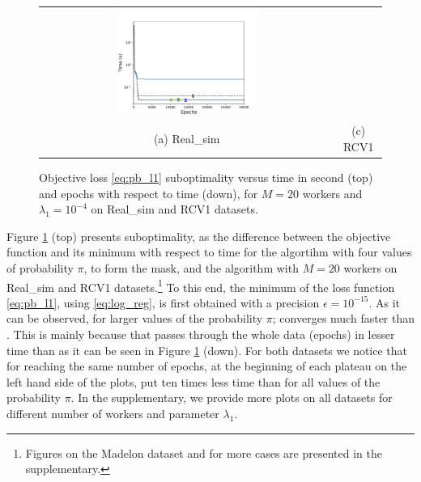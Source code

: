 \begin{figure}[b!]
\begin{tabular}{cc}
\includegraphics[width = 0.5\textwidth]{SODA/Figs/rcv_20w_00001_0001_time_vs_ite.pdf}\\
(a) Real\_sim & (c) RCV1
\end{tabular}
    \caption{Objective loss \eqref{eq:pb_l1} suboptimality versus time in second (top) and epochs with respect to time (down), for $M=20$ workers and $\lambda_1 = 10^{-4}$ on Real\_sim and RCV1 datasets.}
    \label{fig:speed_conv}
\end{figure}
Figure \ref{fig:speed_conv} (top) presents suboptimality, as the difference between the objective function and its minimum with respect to time for the \SP{} algortihm with four values of probability $\pi$, to form the mask, and the \dave{} algorithm \cite{ICML18} with $M=20$ workers on Real\_sim and RCV1 datasets.\footnote{Figures on the Madelon dataset and for more cases are presented in the supplementary.} To this end, the minimum of the loss function \eqref{eq:pb_l1}, using \eqref{eq:log_reg}, is first obtained with a precision $\epsilon=10^{-15}$. As it can be observed, for larger values of the probability $\pi$; \SP{} converges much faster than \dave{}. This is mainly because that \SP{} passes through the whole data (epochs) in lesser time than \dave{} as it can be seen in Figure \ref{fig:speed_conv} (down). For both datasets we notice that for reaching the same number of epochs, at the beginning of each plateau on the left hand side of the plots,  \SP{} put ten times less time than \dave{} for all values of the probability $\pi$.  In the supplementary, we provide more plots on all datasets for different number of workers and parameter $\lambda_1$.




